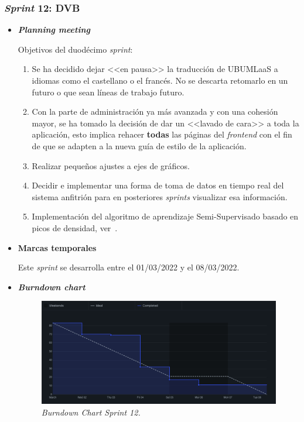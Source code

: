\subsubsection{\textit{Sprint} 12: DVB}
\begin{itemize}
\item \textbf{\textit{Planning meeting}}

Objetivos del duodécimo \textit{sprint}:
\begin{enumerate}
\item Se ha decidido dejar <<en pausa>> la traducción de UBUMLaaS a idiomas como el castellano o el francés. No se descarta retomarlo en un futuro o que sean líneas de trabajo futuro.
\item Con la parte de administración ya más avanzada y con una cohesión mayor, se ha tomado la decisión de dar un <<lavado de cara>> a toda la aplicación, esto implica rehacer \textbf{todas} las páginas del \textit{frontend} con el fin de que se adapten a la nueva guía de estilo de la aplicación.
\item Realizar pequeños ajustes a ejes de gráficos.
\item Decidir e implementar una forma de toma de datos en tiempo real del sistema anfitrión para en posteriores \textit{sprints} visualizar esa información.
\item Implementación del algoritmo de aprendizaje Semi-Supervisado basado en picos de densidad, ver~\cite{WU2018180}.
\end{enumerate}
\item \textbf{Marcas temporales}

Este \textit{sprint} se desarrolla entre el 01/03/2022 y el 08/03/2022.
\item \textbf{\textit{Burndown chart}}
\begin{figure}
\begin{center}
\includegraphics[width=\textwidth]{../img/anexos/sprints/BD-Sprint12}
\caption{\textit{Burndown Chart Sprint 12.}}\label{fig:BD-Sprint12}
\end{center}
\end{figure}


\end{itemize}
